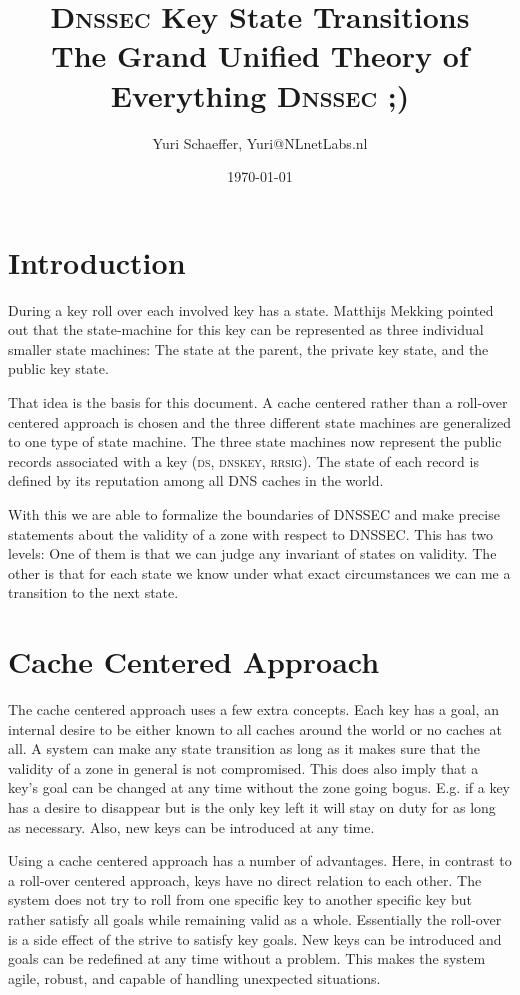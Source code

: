 \documentclass[twoside,english, a4paper]{article}
\title{\textsc{Dnssec} Key State Transitions \\ \small The Grand Unified Theory of Everything \textsc{Dnssec} ;)}
\author{Yuri Schaeffer, Yuri@NLnetLabs.nl}
\date{\today}
\begin{document}
\maketitle
\tableofcontents

\section{Introduction}

During a key roll over each involved key has a state. Matthijs 
Mekking pointed out that the state-machine for this key can be 
represented as three individual smaller state machines: The state at 
the parent, the private key state, and the public key state. 

That idea is the basis for this document. A cache centered rather 
than a roll-over centered approach is chosen and the three different 
state machines are generalized to one type of state machine. The three
state machines now represent the public records associated with a key 
(\textsc{ds}, \textsc{dnskey}, \textsc{rrsig}). The state of each record is defined by its 
reputation among all DNS caches in the world. 

With this we are able to formalize the boundaries of DNSSEC and make
precise statements about the validity of a zone with respect to DNSSEC.
This has two levels: One of them is that we can judge any invariant of
states on validity. The other is that for each state we know under
what exact circumstances we can me a transition to the next state.

\section{Cache Centered Approach}

The cache centered approach uses a few extra concepts. Each key has 
a goal, an internal desire to be either known to all caches around 
the world or no caches at all. A system can make any state 
transition as long as it makes sure that the validity of a zone in 
general is not compromised. This does also imply that a key's goal can
be changed at any time without the zone going bogus. E.g. if a key has
a desire to disappear but is the only key left it will stay on duty for
as long as necessary. Also, new keys can be introduced at any time.

Using a cache centered approach has a number of advantages. Here, in 
contrast to a roll-over centered approach, keys have no direct 
relation to each other. The system does not try to roll from one 
specific key to another specific key but rather satisfy all goals 
while remaining valid as a whole. Essentially the roll-over is a side 
effect of the strive to satisfy key goals. New keys can be 
introduced and goals can be redefined at any time without a problem. 
This makes the system agile, robust, and capable of handling unexpected
situations.
\end{document}
